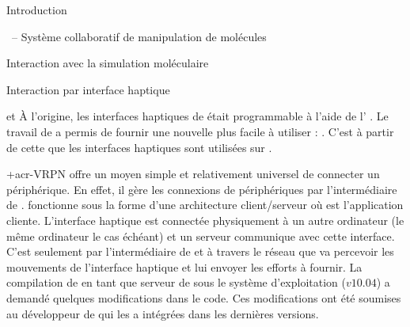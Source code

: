 \documentclass[myfrancais]{mythesis}
\begin{document}
\begin{mypart}{Introduction}
\begin{mychapter}{\myShaddock\ -- Système collaboratif de manipulation de molécules}
\begin{mysection}{Interaction avec la simulation moléculaire}
\begin{mysubsection}{Interaction par interface haptique}
\begin{mysubsubsection}{\myOmni et \myOpenHaptics}
						À l'origine, les interfaces haptiques de \mySensAble était programmable à l'aide de l' \myGhost {}.
						Le travail de  a permis de fournir une nouvelle  plus facile à utiliser : \myOpenHaptics.
						C'est à partir de cette  que les interfaces haptiques sont utilisées sur \myShaddock.
					\end{mysubsubsection}
					\begin{mysubsubsection}{\myacronl+{acr-VRPN}}
						 offre un moyen simple et relativement universel de connecter un périphérique.
						En effet, il gère les connexions de périphériques par l'intermédiaire de  .
						 fonctionne sous la forme d'une architecture client/serveur où  est l'application cliente.
						L'interface haptique est connectée physiquement à un autre ordinateur (le même ordinateur le cas échéant) et un serveur  communique avec cette interface.
						C'est seulement par l'intermédiaire de  et à travers le réseau  que  va percevoir les mouvements de l'interface haptique et lui envoyer les efforts à fournir.
						La compilation de  en tant que serveur de \myOmni sous le système d'exploitation \myLinux (\myUbuntu $v10.04$) a demandé quelques modifications dans le code.
						Ces modifications ont été soumises au développeur de  qui les a intégrées dans les dernières versions.


\end{mysubsubsection}
\end{mysubsection}
\end{mysection}
\end{mychapter}
\end{mypart}
\end{document}
